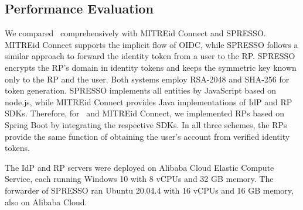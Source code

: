 \subsection{Performance Evaluation}
\label{sec:evaluation}


 We compared \usso\ comprehensively with MITREid Connect and SPRESSO.
MITREid Connect supports the implicit flow of OIDC, while SPRESSO follows a similar approach to forward the identity token from a user to the RP.
SPRESSO encrypts the RP's domain in identity tokens and keeps the symmetric key known only to the RP and the user. Both systems employ RSA-2048 and SHA-256 for token generation.
SPRESSO implements all entities by JavaScript based on node.js, while MITREid Connect provides Java implementations of IdP and RP SDKs.
Therefore, for \usso\ and MITREid Connect, we implemented RPs based on Spring Boot by integrating the respective SDKs. In all three schemes, the RPs provide the same function of obtaining the user's account from verified identity tokens.

The IdP and RP servers were deployed on Alibaba Cloud Elastic Compute Service, each running Windows 10 with 8 vCPUs and 32 GB memory. The forwarder of SPRESSO ran Ubuntu 20.04.4 with 16 vCPUs and 16 GB memory, also on Alibaba Cloud.

